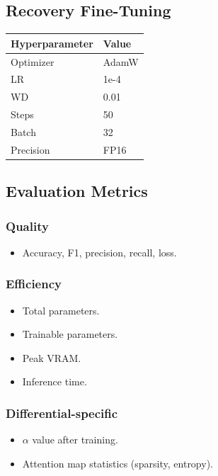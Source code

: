 \subsection{Recovery Fine-Tuning}

\begin{table}[H]
\centering
\small
\begin{tabular}{ll}
\toprule
\textbf{Hyperparameter} & \textbf{Value} \\
\midrule
Optimizer & AdamW \\
LR & 1e-4 \\
WD & 0.01 \\
Steps & 50 \\
Batch & 32 \\
Precision & FP16 \\
\bottomrule
\end{tabular}
\end{table}

\subsection{Evaluation Metrics}

\subsubsection{Quality}
\begin{itemize}
\item Accuracy, F1, precision, recall, loss.

\end{itemize}
\subsubsection{Efficiency}
\begin{itemize}
\item Total parameters.
\item Trainable parameters.
\item Peak VRAM.
\item Inference time.

\end{itemize}
\subsubsection{Differential-specific}
\begin{itemize}
\item $\alpha$ value after training.
\item Attention map statistics (sparsity, entropy).

\end{itemize}
